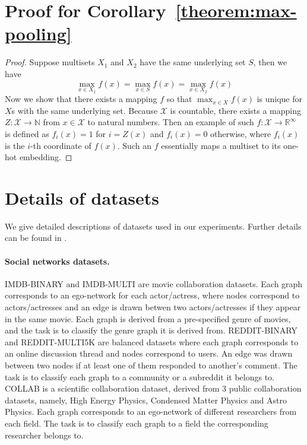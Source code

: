 \begin{appendix}
\section{Proof for Corollary~\ref{theorem:max-pooling}}

\begin{proof}
Suppose multisets $X_1$ and $X_2$ have the same underlying set $S$, then we have \[   \max_{x \in X_1} f(x)  =  \max_{x \in S} f(x)  =   \max_{x \in X_2} f(x) \]
Now we show that there exists a mapping $f$ so that $  \max_{x \in X} f(x) $ is unique for $X$s with the same underlying set. Because $\mathcal{X}$ is countable, there exists a mapping $Z: \mathcal{X} \rightarrow \mathbb{N}$ from $x \in \mathcal{X}$ to natural numbers. Then an example of such $f: \mathcal{X} \rightarrow \mathbb{R}^{\infty}$ is defined as $f_i(x) = 1$ for $i = Z(x)$ and $f_i(x) = 0$ otherwise, where $f_i(x)$ is the $i$-th coordinate of $f(x)$. Such an $f$ essentially maps a multiset to its one-hot embedding. 
\end{proof}

\section{Details of datasets}
\label{app:dataset}
We give detailed descriptions of datasets used in our experiments. Further details can be found in \citep{yanardag2015deep}.
\paragraph{Social networks datasets.} 
IMDB-BINARY and IMDB-MULTI are movie collaboration datasets. Each graph corresponds to an ego-network for each actor/actress, where nodes correspond to actors/actresses and an edge is drawn betwen two actors/actresses if they appear in the same movie. Each graph is derived from a pre-specified genre of movies, and the task is to classify the genre graph it is derived from.
REDDIT-BINARY and REDDIT-MULTI5K are balanced datasets where each graph corresponds to an online discussion thread and nodes correspond to users. An edge was drawn between two nodes if at least one of them responded to another's comment.
The task is to classify each graph to a community or a subreddit it belongs to.
COLLAB is a scientific collaboration dataset, derived from 3 public collaboration datasets, namely, High Energy Physics, Condensed Matter
Physics and Astro Physics. Each graph corresponds to an ego-network of different researchers from
each field. The task is to classify each graph to a field the corresponding researcher belongs to.


\end{appendix}
